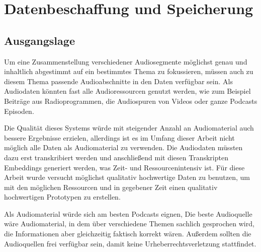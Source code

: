 \chapter{Datenbeschaffung und Speicherung}\label{ch:data}

\section{Ausgangslage}

Um eine Zusammenstellung verschiedener Audiosegmente möglichst genau und inhaltlich abgestimmt auf ein bestimmtes Thema zu fokussieren, müssen auch zu diesem Thema passende Audioabschnitte in den Daten verfügbar sein.
Als Audiodaten könnten fast alle Audioressourcen genutzt werden, wie zum Beispiel Beiträge aus Radioprogrammen, die Audiospuren von Videos oder ganze Podcasts Episoden.

Die Qualität dieses Systems würde mit steigender Anzahl an Audiomaterial auch bessere Ergebnisse erzielen, allerdings ist es im Umfang dieser Arbeit nicht möglich alle Daten als Audiomaterial zu verwenden.
Die Audiodaten müssten dazu erst transkribiert werden und anschließend mit diesen Transkripten Embeddings generiert werden, was Zeit- und Ressourcenintensiv ist.
Für diese Arbeit wurde versucht möglichst qualitativ hochwertige Daten zu benutzen, um mit den möglichen Ressourcen und in gegebener Zeit einen qualitativ hochwertigen Prototypen zu erstellen. 

Als Audiomaterial würde sich am besten Podcasts eignen, 
Die beste Audioquelle wäre Audiomaterial, in dem über verschiedene Themen sachlich gesprochen wird, die Informationen aber gleichzeitig faktisch korrekt wären.
Außerdem sollten die Audioquellen frei verfügbar sein, damit keine Urheberrechtsverletzung stattfindet.








